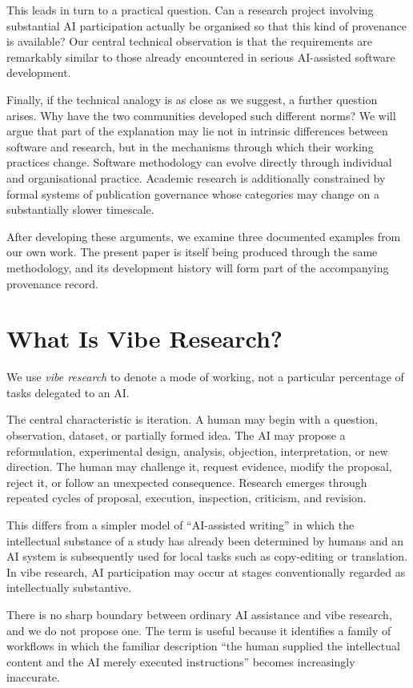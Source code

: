 This leads in turn to a practical question. Can a research project involving substantial AI participation actually be organised so that this kind of provenance is available? Our central technical observation is that the requirements are remarkably similar to those already encountered in serious AI-assisted software development.

Finally, if the technical analogy is as close as we suggest, a further question arises. Why have the two communities developed such different norms? We will argue that part of the explanation may lie not in intrinsic differences between software and research, but in the mechanisms through which their working practices change. Software methodology can evolve directly through individual and organisational practice. Academic research is additionally constrained by formal systems of publication governance whose categories may change on a substantially slower timescale.

After developing these arguments, we examine three documented examples from our own work. The present paper is itself being produced through the same methodology, and its development history will form part of the accompanying provenance record.


\section{What Is Vibe Research?}

We use \emph{vibe research} to denote a mode of working, not a particular percentage of tasks delegated to an AI.

The central characteristic is iteration. A human may begin with a question, observation, dataset, or partially formed idea. The AI may propose a reformulation, experimental design, analysis, objection, interpretation, or new direction. The human may challenge it, request evidence, modify the proposal, reject it, or follow an unexpected consequence. Research emerges through repeated cycles of proposal, execution, inspection, criticism, and revision.

This differs from a simpler model of ``AI-assisted writing'' in which the intellectual substance of a study has already been determined by humans and an AI system is subsequently used for local tasks such as copy-editing or translation. In vibe research, AI participation may occur at stages conventionally regarded as intellectually substantive.

There is no sharp boundary between ordinary AI assistance and vibe research, and we do not propose one. The term is useful because it identifies a family of workflows in which the familiar description ``the human supplied the intellectual content and the AI merely executed instructions'' becomes increasingly inaccurate.

